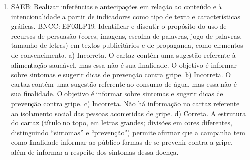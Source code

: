\begin{enumerate}
\item
SAEB: Realizar inferências e antecipações em relação ao conteúdo
e à intencionalidade a partir de indicadores como tipo de texto e
características gráficas.
BNCC: EF03LP19: Identificar e discutir o propósito do uso de recursos de
persuasão (cores, imagens, escolha de palavras, jogo de palavras,
tamanho de letras) em textos publicitários e de propaganda, como
elementos de convencimento.
a) Incorreta. O cartaz contém uma sugestão referente à alimentação 
saudável, mas essa não é sua finalidade. O objetivo é informar sobre 
sintomas e sugerir dicas de prevenção contra gripe.  
b) Incorreta. O cartaz contém uma sugestão referente ao consumo de água,
mas essa não é sua finalidade. O objetivo é informar sobre sintomas e 
sugerir dicas de prevenção contra gripe.
c) Incorreta. Não há informação no cartaz referente ao isolamento social 
das pessoas acometidas de gripe. 
d) Correta. A estrutura do cartaz (título no topo, em letras grandes; 
divisões em cores diferentes, distinguindo ``sintomas'' e ``prevenção'') 
permite afirmar que a campanha tem como finalidade informar ao público 
formas de se prevenir contra a gripe, além de informar a respeito dos
sintomas dessa doença.
\end{enumerate}


